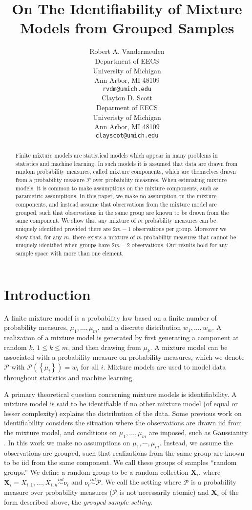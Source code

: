 \documentclass{article} %
\title{On The Identifiability of Mixture Models from Grouped Samples}
\author{
Robert A. Vandermeulen\\
Department of EECS\\
University of Michigan\\
Ann Arbor, MI 48109 \\
\texttt{rvdm@umich.edu} \\
\And
Clayton D. Scott \\
Deparment of EECS\\
Univeristy of Michigan\\
Ann Arbor, MI 48109 \\
\texttt{clayscot@umich.edu} \\
}
\def\sP{\mathscr{P}}
\def\bX{\mathbf{X}}
\def\simiid{\overset{iid}{\sim}}
\theoremstyle{definition}
\begin{document}
\maketitle

\begin{abstract}
Finite mixture models are statistical models which appear in many problems in statistics and machine learning. In such models it is assumed that data are drawn from random probability measures, called mixture components, which are themselves drawn from a probability measure $\sP$  over probability measures. When estimating mixture models, it is common to make assumptions on the mixture components, such as parametric assumptions. In this paper, we make no assumption on the mixture components, and instead assume that observations from the mixture model are grouped, such that observations in the same group are known to be drawn from the same component. We show that any mixture of $m$ probability measures can be uniquely identified provided there are $2m-1$ observations per group. Moreover we show that, for any $m$, there exists a mixture of $m$ probability measures that cannot be uniquely identified when groups have $2m-2$ observations. Our results hold for any sample space with more than one element.
\end{abstract}
\section{Introduction}
A finite mixture model is a probability law based on a finite number of probability measures, $\mu_1, \ldots, \mu_m$, and a discrete distribution $w_1, \ldots, w_m$. A realization of a mixture model is generated by first generating a component at random $k$, $1 \le k \le m$, and then drawing from $\mu_k$. A mixture model can be associated with a probability measure on probability measures, which we denote $\sP$ with $\sP\left( \left\{ \mu_i \right\} \right)= w_i$ for all $i$. Mixture models are used to model data throughout statistics and machine learning.

A primary theoretical question concerning mixture models is identifiability. A mixture model is said to be identifiable if no other mixture model (of equal or lesser complexity) explains the distribution of the data. Some previous work on identifiability considers the situation where the observations are drawn iid from the mixture model, and conditions on $\mu_1, \ldots, \mu_m$ are imposed, such as Gaussianity \cite{dasgupta07,anderson14}. In this work we make no assumptions on $\mu_1,\cdots,\mu_m$. Instead, we assume the observations are grouped, such that realizations from the same group are known to be iid from the same component. We call these groups of samples ``random groups.'' We define a random group to be a random collection $\bX_i$, where $\bX_i =X_{i,1},\dots,X_{i,n} \simiid \nu_i$ and $\nu_i \simiid \sP$. We call the setting where $\sP$ is a probability measure over probability measures ($\sP$ is not necessarily atomic) and $\bX_i$ of the form described above, the {\em grouped sample setting}.
\end{document}

